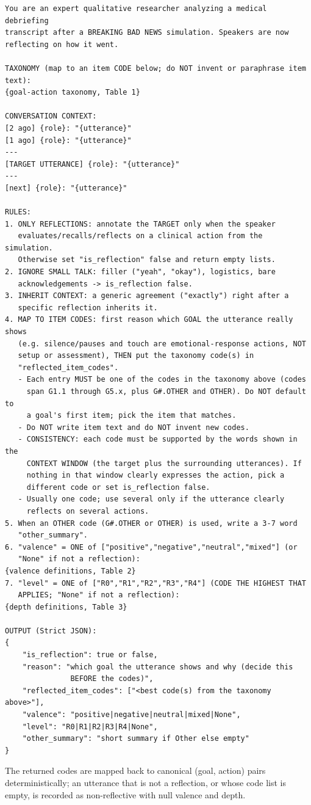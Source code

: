\begin{lstlisting}[basicstyle=\ttfamily\footnotesize,breaklines=true,frame=single]
You are an expert qualitative researcher analyzing a medical debriefing
transcript after a BREAKING BAD NEWS simulation. Speakers are now
reflecting on how it went.

TAXONOMY (map to an item CODE below; do NOT invent or paraphrase item text):
{goal-action taxonomy, Table 1}

CONVERSATION CONTEXT:
[2 ago] {role}: "{utterance}"
[1 ago] {role}: "{utterance}"
---
[TARGET UTTERANCE] {role}: "{utterance}"
---
[next] {role}: "{utterance}"

RULES:
1. ONLY REFLECTIONS: annotate the TARGET only when the speaker
   evaluates/recalls/reflects on a clinical action from the simulation.
   Otherwise set "is_reflection" false and return empty lists.
2. IGNORE SMALL TALK: filler ("yeah", "okay"), logistics, bare
   acknowledgements -> is_reflection false.
3. INHERIT CONTEXT: a generic agreement ("exactly") right after a
   specific reflection inherits it.
4. MAP TO ITEM CODES: first reason which GOAL the utterance really shows
   (e.g. silence/pauses and touch are emotional-response actions, NOT
   setup or assessment), THEN put the taxonomy code(s) in
   "reflected_item_codes".
   - Each entry MUST be one of the codes in the taxonomy above (codes
     span G1.1 through G5.x, plus G#.OTHER and OTHER). Do NOT default to
     a goal's first item; pick the item that matches.
   - Do NOT write item text and do NOT invent new codes.
   - CONSISTENCY: each code must be supported by the words shown in the
     CONTEXT WINDOW (the target plus the surrounding utterances). If
     nothing in that window clearly expresses the action, pick a
     different code or set is_reflection false.
   - Usually one code; use several only if the utterance clearly
     reflects on several actions.
5. When an OTHER code (G#.OTHER or OTHER) is used, write a 3-7 word
   "other_summary".
6. "valence" = ONE of ["positive","negative","neutral","mixed"] (or
   "None" if not a reflection):
{valence definitions, Table 2}
7. "level" = ONE of ["R0","R1","R2","R3","R4"] (CODE THE HIGHEST THAT
   APPLIES; "None" if not a reflection):
{depth definitions, Table 3}

OUTPUT (Strict JSON):
{
    "is_reflection": true or false,
    "reason": "which goal the utterance shows and why (decide this
               BEFORE the codes)",
    "reflected_item_codes": ["<best code(s) from the taxonomy above>"],
    "valence": "positive|negative|neutral|mixed|None",
    "level": "R0|R1|R2|R3|R4|None",
    "other_summary": "short summary if Other else empty"
}
\end{lstlisting}

The returned codes are mapped back to canonical (goal, action) pairs deterministically;
an utterance that is not a reflection, or whose code list is empty, is recorded as
non-reflective with null valence and depth.
